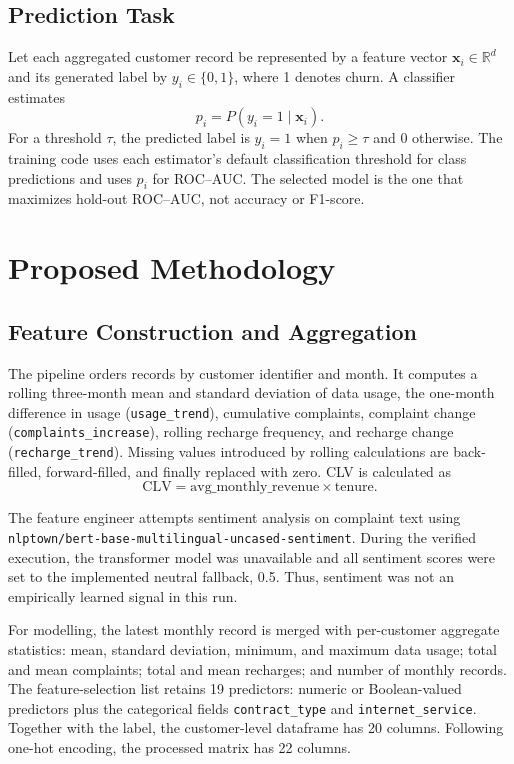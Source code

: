 \documentclass[conference]{IEEEtran}
\begin{document}
\subsection{Prediction Task}
Let each aggregated customer record be represented by a feature vector $\mathbf{x}_i\in\mathbb{R}^{d}$ and its generated label by $y_i\in\{0,1\}$, where 1 denotes churn. A classifier estimates
\begin{equation}
p_i=P(y_i=1\mid\mathbf{x}_i).
\end{equation}
For a threshold $\tau$, the predicted label is $\hat{y}_i=1$ when $p_i\geq\tau$ and 0 otherwise. The training code uses each estimator's default classification threshold for class predictions and uses $p_i$ for ROC--AUC. The selected model is the one that maximizes hold-out ROC--AUC, not accuracy or F1-score.

\section{Proposed Methodology}
\subsection{Feature Construction and Aggregation}
The pipeline orders records by customer identifier and month. It computes a rolling three-month mean and standard deviation of data usage, the one-month difference in usage (\texttt{usage\_trend}), cumulative complaints, complaint change (\texttt{complaints\_increase}), rolling recharge frequency, and recharge change (\texttt{recharge\_trend}). Missing values introduced by rolling calculations are back-filled, forward-filled, and finally replaced with zero. CLV is calculated as
\begin{equation}
\mathrm{CLV}=\mathrm{avg\_monthly\_revenue}\times\mathrm{tenure}.
\end{equation}

The feature engineer attempts sentiment analysis on complaint text using \texttt{nlptown/bert-base-multilingual-uncased-sentiment}. During the verified execution, the transformer model was unavailable and all sentiment scores were set to the implemented neutral fallback, 0.5. Thus, sentiment was not an empirically learned signal in this run.

For modelling, the latest monthly record is merged with per-customer aggregate statistics: mean, standard deviation, minimum, and maximum data usage; total and mean complaints; total and mean recharges; and number of monthly records. The feature-selection list retains 19 predictors: numeric or Boolean-valued predictors plus the categorical fields \texttt{contract\_type} and \texttt{internet\_service}. Together with the label, the customer-level dataframe has 20 columns. Following one-hot encoding, the processed matrix has 22 columns.
\end{document}
